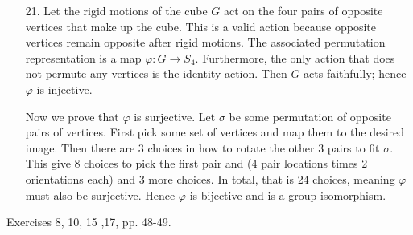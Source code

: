 \documentclass[12pt]{article}
\theoremstyle{remark}
\theoremstyle{named}
\begin{document}
\begin{enumerate}
    \item [21.] Let the rigid motions of the cube \(G\) act on the four pairs of opposite vertices that make up the cube. This is a valid action because opposite vertices remain opposite after rigid motions. The associated permutation representation is a map \(\varphi : G \to S_4\). Furthermore, the only action that does not permute any vertices is the identity action. Then \(G\) acts faithfully; hence \(\varphi\) is injective. 
    
    Now we prove that \(\varphi\) is surjective. Let \(\sigma\) be some permutation of opposite pairs of vertices. First pick some set of vertices and map them to the desired image. Then there are 3 choices in how to rotate the other 3 pairs to fit \(\sigma\). This give 8 choices to pick the first pair and (4 pair locations times 2 orientations each) and 3 more choices. In total, that is 24 choices, meaning \(\varphi\) must also be surjective. Hence \(\varphi\) is bijective and is a group isomorphism.
\end{enumerate}

Exercises 8, 10, 15 ,17, pp. 48-49.
\end{document}
